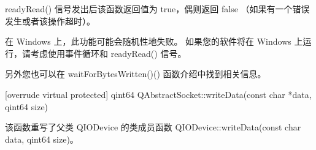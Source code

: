 readyRead() 信号发出后该函数返回值为 true，偶则返回 false （如果有一个错误发生或者该操作超时）。

\begin{notice}
在 Windows 上，此功能可能会随机性地失败。 如果您的软件将在 Windows 上运行，请考虑使用事件循环和 readyRead() 信号。
\end{notice}


另外您也可以在 waitForBytesWritten()() 函数介绍中找到相关信息。

\splitLine

[overrude virtual protected] qint64 QAbstractSocket::writeData(const char *data, qint64 size)

该函数重写了父类 QIODevice 的类成员函数 QIODevice::writeData(const
char data, qint64 size)。


